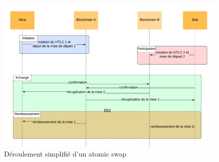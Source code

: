 \begin{figure}[h!]
    \centering
    \includegraphics[scale=0.15]{decentralisation/atomicSwap.png}
    \caption{Déroulement simplifié d'un \gls{atomic swap}}
    \label{fig:atomicSwap}
\end{figure}

